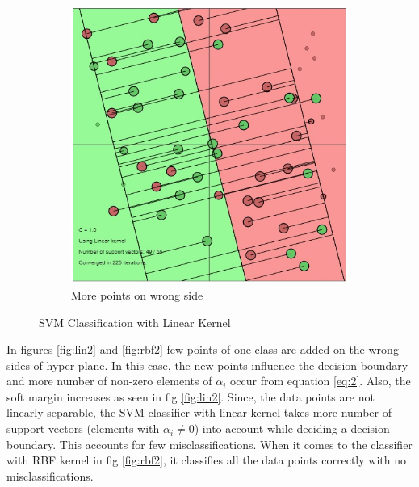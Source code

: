 {\begin{figure}[ht]
\begin{subfigure}{.3\textwidth}
  			\includegraphics[width=.7\linewidth]{Exercise1/Report/linear_kernel_3.jpg}
  			\caption{More points on wrong side}
  			\label{fig:lin3}
  		\end{subfigure}%
  		\caption{SVM Classification with Linear Kernel}
  		\label{fig:lin_rbf1}
  	  \end{figure}
    
	   In figures \ref{fig:lin2} and \ref{fig:rbf2} few points of one class are added on the wrong sides of hyper plane. In this case, the new points influence the decision boundary and more number of non-zero elements of $\alpha_i$ occur from equation \ref{eq:2}. Also, the soft margin increases as seen in fig \ref{fig:lin2}. Since, the data points are not linearly separable, the SVM classifier with linear kernel takes more number of support vectors (elements with $\alpha_i \neq 0$) into account while deciding a decision boundary.  This accounts for few misclassifications. When it comes to the classifier with RBF kernel in fig \ref{fig:rbf2}, it classifies all the data points correctly with no misclassifications. 

}
